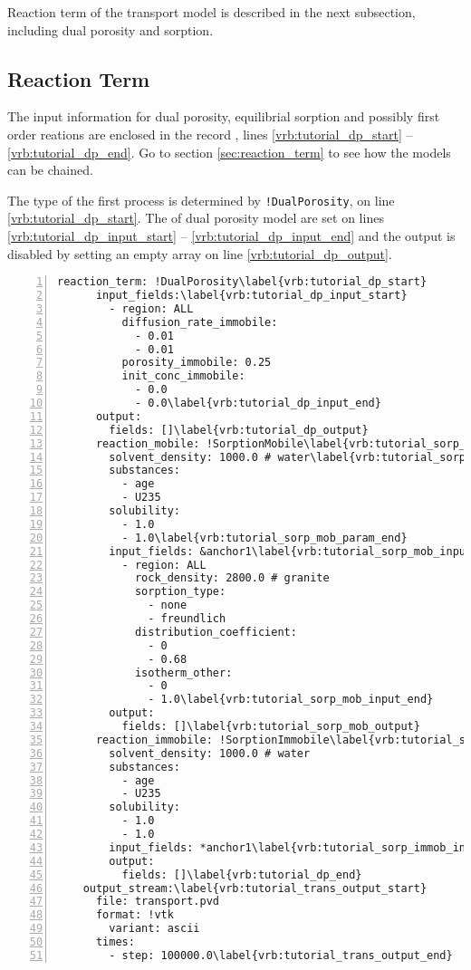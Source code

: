 Reaction term of the transport model is described in the next subsection, including dual porosity and sorption.

\subsection{Reaction Term}\label{subsubsec:reactions}
The input information for dual porosity, equilibrial sorption and possibly first order reations are enclosed in the record 
, lines \ref{vrb:tutorial_dp_start} -- \ref{vrb:tutorial_dp_end}. Go to section \ref{sec:reaction_term}
to see how the models can be chained.

The type of the first process is determined by {\tt !DualPorosity}, on line \ref{vrb:tutorial_dp_start}. 
The 
of dual porosity model are set on lines \ref{vrb:tutorial_dp_input_start} -- \ref{vrb:tutorial_dp_input_end} and the output is disabled by setting an empty array on line \ref{vrb:tutorial_dp_output}.

\begin{Verbatim}[numbers=left, firstnumber=last,commandchars=\\\{\}]
    reaction_term: !DualPorosity\label{vrb:tutorial_dp_start}
      input_fields:\label{vrb:tutorial_dp_input_start}
        - region: ALL
          diffusion_rate_immobile:
            - 0.01
            - 0.01
          porosity_immobile: 0.25
          init_conc_immobile:
            - 0.0
            - 0.0\label{vrb:tutorial_dp_input_end}
      output:
        fields: []\label{vrb:tutorial_dp_output}
      reaction_mobile: !SorptionMobile\label{vrb:tutorial_sorp_mob}
        solvent_density: 1000.0 # water\label{vrb:tutorial_sorp_mob_param_start}
        substances:
          - age
          - U235
        solubility:
          - 1.0
          - 1.0\label{vrb:tutorial_sorp_mob_param_end}
        input_fields: &anchor1\label{vrb:tutorial_sorp_mob_input_start}
          - region: ALL
            rock_density: 2800.0 # granite
            sorption_type:
              - none
              - freundlich
            distribution_coefficient:
              - 0
              - 0.68
            isotherm_other:
              - 0
              - 1.0\label{vrb:tutorial_sorp_mob_input_end}
        output:
          fields: []\label{vrb:tutorial_sorp_mob_output}
      reaction_immobile: !SorptionImmobile\label{vrb:tutorial_sorp_immob}
        solvent_density: 1000.0 # water
        substances:
          - age
          - U235
        solubility:
          - 1.0
          - 1.0
        input_fields: *anchor1\label{vrb:tutorial_sorp_immob_input}
        output:
          fields: []\label{vrb:tutorial_dp_end}
    output_stream:\label{vrb:tutorial_trans_output_start}
      file: transport.pvd
      format: !vtk
        variant: ascii
      times:
        - step: 100000.0\label{vrb:tutorial_trans_output_end}
\end{Verbatim}

